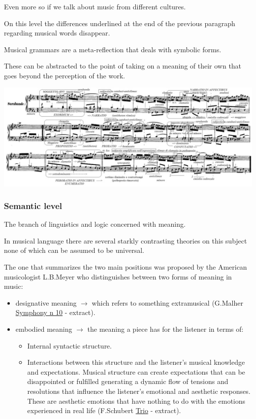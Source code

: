 Even more so if we talk about music from different cultures.

On this level the differences underlined at the end of the previous paragraph regarding musical words disappear.

Musical grammars are a meta-reflection that deals with symbolic forms.

These can be abstracted to the point of taking on a meaning of their own that goes beyond the perception of the work.

\begin{center}
\includegraphics[scale=1.1]{../img/analisische.png}
\end{center}

\subsubsection{Semantic level}\label{semantic-level}

The branch of linguistics and logic concerned with meaning.

In musical language there are several starkly contrasting theories on this subject none of which can be assumed to be universal.

The one that summarizes the two main positions was proposed by the American musicologist L.B.Meyer who distinguishes between two forms of meaning in music:

\begin{itemize}
\tightlist
\item designative meaning \(\rightarrow\) which refers to something extramusical (G.Malher \href{http://www.musicaecodice.it/gitmedia/emc/1_media/malher.mp3}{Symphony n 10} - extract).
\item embodied meaning \(\rightarrow\) the meaning a piece has for the listener in terms of:

  \begin{itemize}
  \tightlist
  \item Internal syntactic structure.
  \item Interactions between this structure and the listener's musical knowledge and expectations. Musical structure can create expectations that can be disappointed or fulfilled generating a dynamic flow of tensions and resolutions that influence the listener's emotional and aesthetic responses. These are aesthetic emotions that have nothing to do with the emotions experienced in real life (F.Schubert \href{http://www.musicaecodice.it/gitmedia/emc/1_media/schubert.mp3}{Trio} - extract).
  \end{itemize}
\end{itemize}

